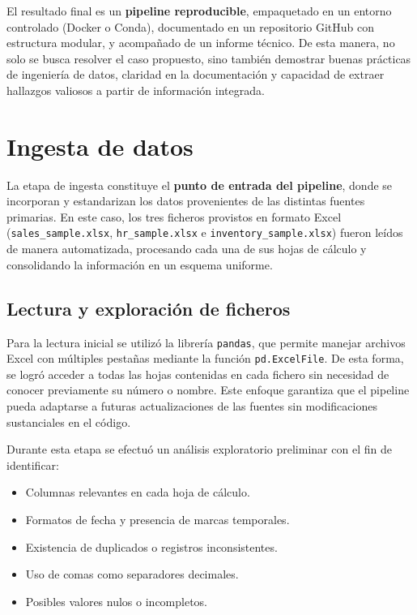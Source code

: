 \documentclass[12pt,a4paper]{article}
\begin{document}
El resultado final es un \textbf{pipeline reproducible}, empaquetado en un entorno controlado 
(Docker o Conda), documentado en un repositorio GitHub con estructura modular, y acompañado de un informe técnico.  
De esta manera, no solo se busca resolver el caso propuesto, sino también demostrar buenas prácticas 
de ingeniería de datos, claridad en la documentación y capacidad de extraer hallazgos valiosos a partir de información integrada.


\section{Ingesta de datos}

La etapa de ingesta constituye el \textbf{punto de entrada del pipeline}, donde se incorporan y 
estandarizan los datos provenientes de las distintas fuentes primarias. En este caso, 
los tres ficheros provistos en formato Excel (\texttt{sales\_sample.xlsx}, 
\texttt{hr\_sample.xlsx} e \texttt{inventory\_sample.xlsx}) fueron leídos de manera automatizada, 
procesando cada una de sus hojas de cálculo y consolidando la información en un esquema uniforme.

\subsection{Lectura y exploración de ficheros}
Para la lectura inicial se utilizó la librería \texttt{pandas}, que permite manejar archivos Excel 
con múltiples pestañas mediante la función \texttt{pd.ExcelFile}. De esta forma, se logró acceder 
a todas las hojas contenidas en cada fichero sin necesidad de conocer previamente su número o nombre. 
Este enfoque garantiza que el pipeline pueda adaptarse a futuras actualizaciones de las fuentes 
sin modificaciones sustanciales en el código.

Durante esta etapa se efectuó un análisis exploratorio preliminar con el fin de identificar:
\begin{itemize}
    \item Columnas relevantes en cada hoja de cálculo.
    \item Formatos de fecha y presencia de marcas temporales.
    \item Existencia de duplicados o registros inconsistentes.
    \item Uso de comas como separadores decimales.
    \item Posibles valores nulos o incompletos.
\end{itemize}
\end{document}
